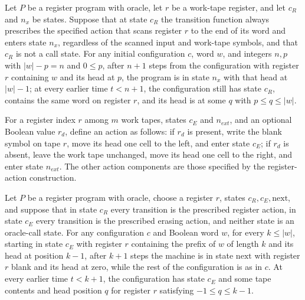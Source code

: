 \begin{lemma}
\label{Complexity.LogProg.toEnd_run}
\leanok
{}
Let $P$ be a register program with oracle, let $r$ be a work-tape register, and let
$c_R$ and $n_x$ be states. Suppose that at state $c_R$ the transition function always
prescribes the specified action that scans register $r$ to the end of its word and
enters state $n_x$, regardless of the scanned input and work-tape symbols, and that
$c_R$ is not a call state. For any initial configuration $c$, word $w$, and integers
$n,p$ with $|w|-p=n$ and $0\le p$, after $n+1$ steps from the configuration with
register $r$ containing $w$ and its head at $p$, the program is in state $n_x$ with that
head at $|w|-1$; at every earlier time $t<n+1$, the configuration still has state $c_R$,
contains the same word on register $r$, and its head is at some $q$ with $p\le q\le
|w|$.
\end{lemma}

\begin{definition}
\label{Complexity.LogProg.clrEAct}
\leanok
{}
For a register index $r$ among $m$ work tapes, states $c_E$ and $n_{ext}$, and an
optional Boolean value $r_d$, define an action as follows: if $r_d$ is present, write
the blank symbol on tape $r$, move its head one cell to the left, and enter state $c_E$;
if $r_d$ is absent, leave the work tape unchanged, move its head one cell to the right,
and enter state $n_{ext}$. The other action components are those specified by the
register-action construction.
\end{definition}

\begin{lemma}
\label{Complexity.LogProg.clrE_run}
\leanok
{}
Let $P$ be a register program with oracle, choose a register $r$, states
$c_R,c_E,\mathrm{next}$, and suppose that in state $c_R$ every transition is the
prescribed register action, in state $c_E$ every transition is the prescribed erasing
action, and neither state is an oracle-call state. For any configuration $c$ and Boolean
word $w$, for every $k\le |w|$, starting in state $c_E$ with register $r$ containing the
prefix of $w$ of length $k$ and its head at position $k-1$, after $k+1$ steps the
machine is in state $\mathrm{next}$ with register $r$ blank and its head at zero, while
the rest of the configuration is as in $c$. At every earlier time $t<k+1$, the
configuration has state $c_E$ and some tape contents and head position $q$ for register
$r$ satisfying $-1\le q\le k-1$.
\end{lemma}

